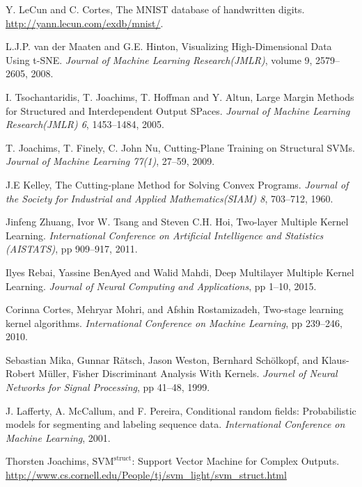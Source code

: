 \documentclass[a4paper, 12pt, oneside]{Thesis}  %
\begin{document}
\begin{thebibliography}{9}
 Y. LeCun and C. Cortes, The MNIST database of handwritten digits. \newblock \url{http://yann.lecun.com/exdb/mnist/}.

 L.J.P. van der Maaten and G.E. Hinton, Visualizing High-Dimensional Data Using t-SNE. \newblock \emph{Journal of Machine Learning Research(JMLR)}, volume 9, 2579--2605, 2008. 

 I. Tsochantaridis, T. Joachims, T. Hoffman and Y. Altun, Large Margin Methods for Structured and Interdependent Output SPaces. \newblock \emph{Journal of Machine Learning Research(JMLR) 6}, 1453--1484, 2005.

 T. Joachims, T. Finely, C. John Nu, Cutting-Plane Training on Structural SVMs. \newblock \emph{Journal of Machine Learning 77(1)}, 27--59, 2009.

 J.E Kelley, The Cutting-plane Method for Solving Convex Programs. \newblock \emph{Journal of the Society for Industrial and Applied Mathematics(SIAM) 8}, 703--712, 1960.

 Jinfeng Zhuang, Ivor W. Tsang and Steven C.H. Hoi, Two-layer Multiple Kernel Learning. \newblock \emph{International Conference on Artificial Intelligence and Statistics (AISTATS)}, pp 909--917, 2011. 

 Ilyes Rebai, Yassine BenAyed and Walid Mahdi, Deep Multilayer Multiple Kernel Learning. \newblock \emph{Journal of Neural Computing and Applications}, pp 1--10, 2015.

Corinna Cortes, Mehryar Mohri, and Afshin Rostamizadeh, Two-stage learning kernel algorithms. \newblock \emph{International Conference on Machine Learning}, pp 239--246, 2010.

 Sebastian Mika, Gunnar R\"{a}tsch, Jason Weston, Bernhard Sch\"{o}lkopf, and Klaus-Robert M\"{u}ller, Fisher Discriminant Analysis With Kernels. \newblock \emph{Journel of Neural Networks for Signal Processing}, pp 41--48, 1999.

 J. Lafferty, A. McCallum, and F. Pereira, Conditional random fields: Probabilistic models for segmenting and labeling sequence data. \newblock \emph{International Conference on Machine Learning}, 2001.

 Thorsten Joachims, $\textrm{SVM}^{\textrm{struct}}$: Support Vector Machine for Complex Outputs. \newblock \url{http://www.cs.cornell.edu/People/tj/svm_light/svm_struct.html}
\end{thebibliography}
\end{document}
